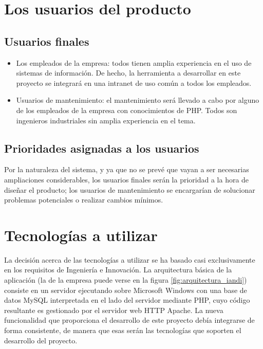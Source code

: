 \section{Los usuarios del producto}

\subsection{Usuarios finales}

\begin{itemize}
 \item Los empleados de la empresa: todos tienen amplia
experiencia en el uso de sistemas de información. De hecho, la herramienta a
desarrollar en este proyecto se integrará en una intranet de uso común a todos
los empleados.

\item Usuarios de mantenimiento: el mantenimiento será llevado a cabo por
alguno de los empleados de la empresa con conocimientos de PHP. Todos son
ingenieros industriales sin amplia experiencia en el tema.
\end{itemize}

\subsection{Prioridades asignadas a los usuarios}

Por la naturaleza del sistema, y ya que no se prevé que vayan a
ser necesarias ampliaciones considerables, los usuarios finales serán la
prioridad a la hora de diseñar el producto; los usuarios de mantenimiento se
encargarían de solucionar problemas potenciales o realizar cambios mínimos.

\section{Tecnologías a utilizar}
\label{sec:tecnologias}

La decisión acerca de las tecnologías a utilizar se ha basado casi
exclusivamente en los requisitos de Ingeniería e Innovación. La arquitectura
básica de la aplicación (la de la empresa puede verse en la figura
\ref{fig:arquitectura_iandi}) consiste en un servidor ejecutando sobre Microsoft
Windows con una base de datos MySQL interpretada en el lado del servidor
mediante PHP, cuyo código resultante es gestionado por el servidor web HTTP
Apache. La nueva funcionalidad que proporciona el desarrollo de este proyecto
debía integrarse de forma consistente, de manera que esas serán las tecnologías
que soporten el desarrollo del proyecto.

